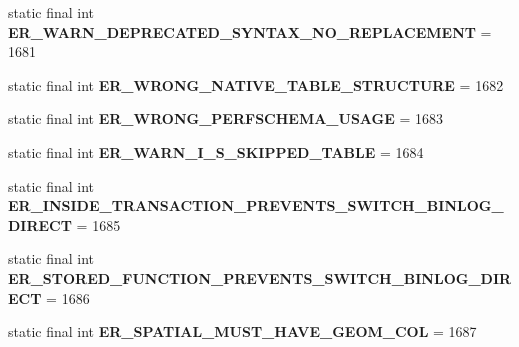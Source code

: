 \begin{DoxyCompactItemize}
static final int {\bfseries E\+R\+\_\+\+W\+A\+R\+N\+\_\+\+D\+E\+P\+R\+E\+C\+A\+T\+E\+D\+\_\+\+S\+Y\+N\+T\+A\+X\+\_\+\+N\+O\+\_\+\+R\+E\+P\+L\+A\+C\+E\+M\+E\+NT} = 1681
\item 
\mbox{\label{classcom_1_1mysql_1_1cj_1_1exceptions_1_1_mysql_error_numbers_ad2a78d77234286a7e357a110c94f60b7}} 
static final int {\bfseries E\+R\+\_\+\+W\+R\+O\+N\+G\+\_\+\+N\+A\+T\+I\+V\+E\+\_\+\+T\+A\+B\+L\+E\+\_\+\+S\+T\+R\+U\+C\+T\+U\+RE} = 1682
\item 
\mbox{\label{classcom_1_1mysql_1_1cj_1_1exceptions_1_1_mysql_error_numbers_aca9987fdb034590613b1154e5e9aaa64}} 
static final int {\bfseries E\+R\+\_\+\+W\+R\+O\+N\+G\+\_\+\+P\+E\+R\+F\+S\+C\+H\+E\+M\+A\+\_\+\+U\+S\+A\+GE} = 1683
\item 
\mbox{\label{classcom_1_1mysql_1_1cj_1_1exceptions_1_1_mysql_error_numbers_ad0d3de141054d7cb717ae2e7cd6a8fbd}} 
static final int {\bfseries E\+R\+\_\+\+W\+A\+R\+N\+\_\+\+I\+\_\+\+S\+\_\+\+S\+K\+I\+P\+P\+E\+D\+\_\+\+T\+A\+B\+LE} = 1684
\item 
\mbox{\label{classcom_1_1mysql_1_1cj_1_1exceptions_1_1_mysql_error_numbers_a1c5416b43b6c83814425454586bb9452}} 
static final int {\bfseries E\+R\+\_\+\+I\+N\+S\+I\+D\+E\+\_\+\+T\+R\+A\+N\+S\+A\+C\+T\+I\+O\+N\+\_\+\+P\+R\+E\+V\+E\+N\+T\+S\+\_\+\+S\+W\+I\+T\+C\+H\+\_\+\+B\+I\+N\+L\+O\+G\+\_\+\+D\+I\+R\+E\+CT} = 1685
\item 
\mbox{\label{classcom_1_1mysql_1_1cj_1_1exceptions_1_1_mysql_error_numbers_a633d64f65c6d761dc2f8b8190dcb2d3f}} 
static final int {\bfseries E\+R\+\_\+\+S\+T\+O\+R\+E\+D\+\_\+\+F\+U\+N\+C\+T\+I\+O\+N\+\_\+\+P\+R\+E\+V\+E\+N\+T\+S\+\_\+\+S\+W\+I\+T\+C\+H\+\_\+\+B\+I\+N\+L\+O\+G\+\_\+\+D\+I\+R\+E\+CT} = 1686
\item 
\mbox{\label{classcom_1_1mysql_1_1cj_1_1exceptions_1_1_mysql_error_numbers_a4f684fc4cc0716bef4d1af430ba58ce2}} 
static final int {\bfseries E\+R\+\_\+\+S\+P\+A\+T\+I\+A\+L\+\_\+\+M\+U\+S\+T\+\_\+\+H\+A\+V\+E\+\_\+\+G\+E\+O\+M\+\_\+\+C\+OL} = 1687

\end{DoxyCompactItemize}
